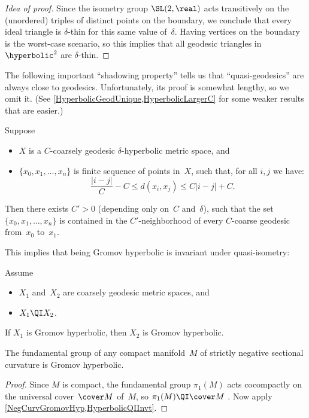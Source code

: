 \begin{proof}[Idea of proof]
Since the isometry group $\SL(2,\real)$ acts transitively on the (unordered) triples of distinct points on the boundary, we conclude that every ideal triangle is $\delta$-thin for this same value of~$\delta$. Having vertices on the boundary is the worst-case scenario, so this implies that all geodesic triangles in $\hyperbolic^2$ are $\delta$-thin.
\end{proof}

The following important ``shadowing property'' tells us that ``quasi-geodesics'' are always close to geodesics. Unfortunately, its proof is somewhat lengthy, so we omit it. (See \cref{HyperbolicGeodUnique,HyperbolicLargerC} for some weaker results that are easier.) 

\begin{thm} \label{CoarseShadowing}
Suppose 
	\begin{itemize}
	\item $X$ is a $C$-coarsely geodesic $\delta$-hyperbolic metric space,
	and
	\item $\{x_0,x_1,\ldots,x_n\}$ is finite sequence of points in~$X$, such that, for all $i,j$ we have:
		$$ \frac{|i - j|}{C} - C \le d(x_i, x_j) \le C|i - j| + C .$$
	\end{itemize}
Then there exists $C' > 0$ \textup(depending only on~$C$ and~$\delta$\textup), such that the set $\{x_0,x_1,\ldots,x_n\}$ is contained in the $C'$-neighborhood of every $C$-coarse geodesic from~$x_0$ to~$x_1$.
\end{thm}

This implies that being Gromov hyperbolic is invariant under quasi-isometry:

\begin{cor} \label{HyperbolicQIInvt}
Assume
\noprelistbreak
	\begin{itemize}
	\item $X_1$ and~$X_2$ are coarsely geodesic metric spaces,
	and
	\item $X_1 \QI X_2$.
	\end{itemize}
If $X_1$ is Gromov hyperbolic, then $X_2$ is Gromov hyperbolic.
\end{cor}

\begin{cor}
The fundamental group of any compact manifold~$M$ of strictly negative sectional curvature is Gromov hyperbolic.
\end{cor}

\begin{proof}
Since $M$ is compact, the fundamental group $\pi_1(M)$ acts cocompactly on the universal cover~$\cover M$ of~$M$, so $\pi_1(M) \QI \cover M$ . Now apply \cref{NegCurvGromovHyp,HyperbolicQIInvt}.
\end{proof}

